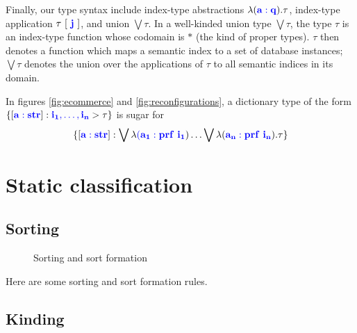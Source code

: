 \documentclass[sigplan,10pt,review,anonymous]{acmart}
\newcommand{\blum}[1]{\mathbf{\color{blue}{#1}}}
\begin{document}
Finally, our type syntax include index-type abstractions $\lambda (\blum{a : q}). \tau$, index-type application $\tau~[~\blum{j}~]$, and union $\bigvee \tau$. In a well-kinded union type $\bigvee \tau$, the type $\tau$ is an index-type function whose codomain is $\ast$ (the kind of proper types). $\tau$ then denotes a function which maps a semantic index to a set of database instances; $\bigvee \tau$ denotes the union over the applications of $\tau$ to all semantic indices in its domain. 
   

In figures \ref{fig:ecommerce} and \ref{fig:reconfigurations}, a dictionary type of the form $\{ [\blum{a :str}] : \blum{i_1, \ldots, i_n} > \tau \}$ is sugar for $$\{ [\blum{a :str}] : \bigvee \lambda \blum{(a_1 : prf~i_1}) \ldots \bigvee \lambda (\blum{a_n : prf~i_n}). \tau \}$$



\section{Static classification}

\subsection{Sorting}

\begin{figure}
\caption{Sorting and sort formation}
\label{fig:sorting}
\end{figure}

Here are some sorting and sort formation rules.

\subsection{Kinding}
\end{document}
